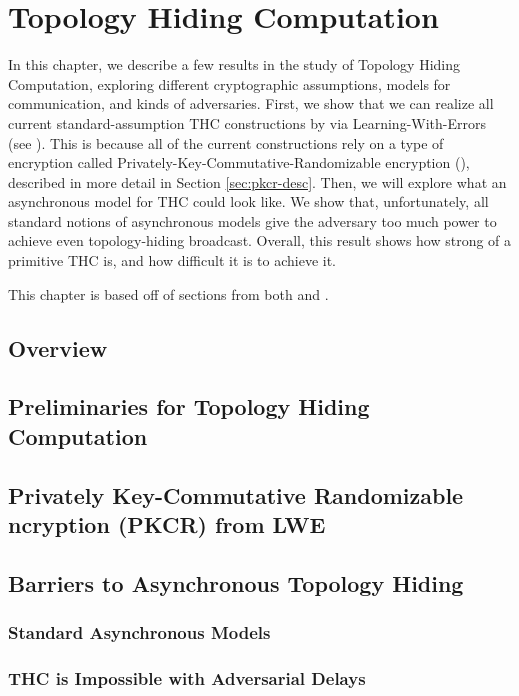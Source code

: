 \chapter{Topology Hiding Computation}\label{chap:THC}
In this chapter, we describe a few results in the study of Topology Hiding Computation, exploring different cryptographic assumptions, models for communication, and kinds of adversaries.
First, we show that we can realize all current standard-assumption THC constructions by via Learning-With-Errors (see \cite{C:Regev06}). This is because all of the current constructions rely on a type of encryption called Privately-Key-Commutative-Randomizable encryption (\PKCR), described in more detail in Section \ref{sec:pkcr-desc}.
Then, we will explore what an asynchronous model for THC could look like. We show that, unfortunately, all standard notions of asynchronous models give the adversary too much power to achieve even topology-hiding broadcast.
Overall, this result shows how strong of a primitive THC is, and how difficult it is to achieve it.

This chapter is based off of sections from both \cite{LLMMMT18} and \cite{LLMMMT20}.

\section{Overview}


\section{Preliminaries for Topology Hiding Computation}\label{sec:thc-prelim}


\section{Privately Key-Commutative Randomizable\texorpdfstring{\\}
	Encryption (PKCR) from LWE}
\label{sec:lwe-pkcr}

\section{Barriers to Asynchronous Topology Hiding}\label{sec:impossible}

\subsection{Standard Asynchronous Models}

\subsection{THC is Impossible with Adversarial Delays}




